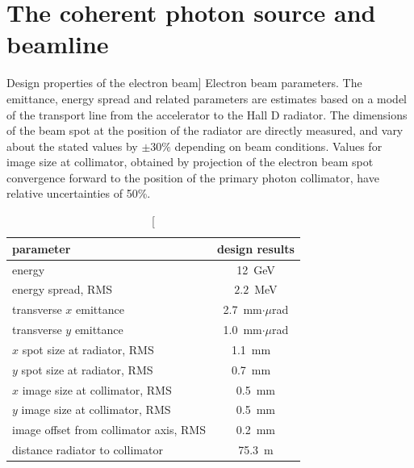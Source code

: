 \section[The coherent photon source and beamline]{The coherent photon source and beamline \label{sec:beamline}}

\begin{table}[tbp]
\begin{center}
\caption
[Design properties of the electron beam]
{Electron beam parameters. 
The emittance, energy spread and
related parameters are estimates
based on a model of the transport line from
the accelerator to the Hall D radiator.
The dimensions of the beam spot at the position of 
the radiator are directly measured, and vary about the
stated values by $\pm 30\%$
depending on beam conditions. 
Values for image size at collimator,
obtained by projection of the electron beam
spot convergence forward to the position of
the primary photon collimator, have relative
uncertainties of 50\%.}
\label{tab:elecprop}
\begin{tabular}{|l|c|}
\hline\hline
parameter & design results \\
\hline
energy & 12~GeV \\
energy spread, RMS & $2.2$~MeV \\
transverse $x$ emittance & 2.7~mm$\cdot\mu$rad \\
transverse $y$ emittance & 1.0~mm$\cdot\mu$rad \\
$x$ spot size at radiator, RMS & 1.1~mm \ \\
$y$ spot size at radiator, RMS & 0.7~mm \ \\
$x$ image size at collimator, RMS & 0.5~mm \\
$y$ image size at collimator, RMS & 0.5~mm \\
image offset from collimator axis, RMS & 0.2~mm \\
distance radiator to collimator & 75.3~m \\
\hline\hline
\end{tabular}
\end{center}
\end{table}

